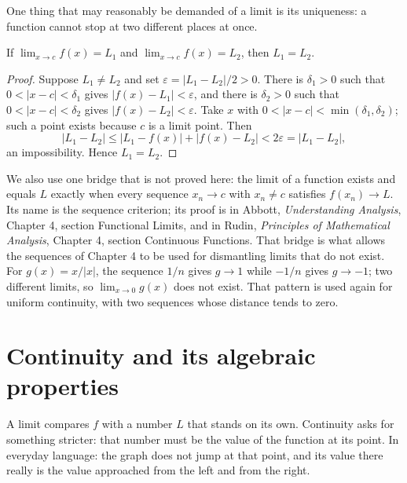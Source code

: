 One thing that may reasonably be demanded of a limit is its uniqueness: a function cannot
stop at two different places at once.

\begin{teorema}
If $\lim_{x\to c}f(x)=L_{1}$ and $\lim_{x\to c}f(x)=L_{2}$, then $L_{1}=L_{2}$.
\end{teorema}

\begin{proof}
Suppose $L_{1}\neq L_{2}$ and set $\varepsilon=|L_{1}-L_{2}|/2>0$. There is
$\delta_{1}>0$ such that $0<|x-c|<\delta_{1}$ gives $|f(x)-L_{1}|<\varepsilon$, and
there is $\delta_{2}>0$ such that $0<|x-c|<\delta_{2}$ gives $|f(x)-L_{2}|<\varepsilon$.
Take $x$ with $0<|x-c|<\min(\delta_{1},\delta_{2})$; such a point exists because
$c$ is a limit point. Then
\[
|L_{1}-L_{2}|\le|L_{1}-f(x)|+|f(x)-L_{2}|<2\varepsilon=|L_{1}-L_{2}|,
\]
an impossibility. Hence $L_{1}=L_{2}$.
\end{proof}

We also use one bridge that is not proved here: the limit of a function exists and
equals $L$ exactly when every sequence $x_{n}\to c$ with $x_{n}\neq c$ satisfies
$f(x_{n})\to L$. Its name is the sequence criterion; its proof is in Abbott,
\emph{Understanding Analysis}, Chapter 4, section Functional Limits, and in Rudin,
\emph{Principles of Mathematical Analysis}, Chapter 4, section Continuous Functions.
That bridge is what allows the sequences of Chapter 4 to be used for dismantling limits
that do not exist. For $g(x)=x/|x|$, the sequence $1/n$ gives $g\to 1$ while $-1/n$ gives
$g\to -1$; two different limits, so $\lim_{x\to 0}g(x)$ does not exist. That pattern is
used again for uniform continuity, with two sequences whose distance tends to zero.

\section{Continuity and its algebraic properties}

A limit compares $f$ with a number $L$ that stands on its own. Continuity asks for
something stricter: that number must be the value of the function at its point. In
everyday language: the graph does not jump at that point, and its value there really is
the value approached from the left and from the right.


